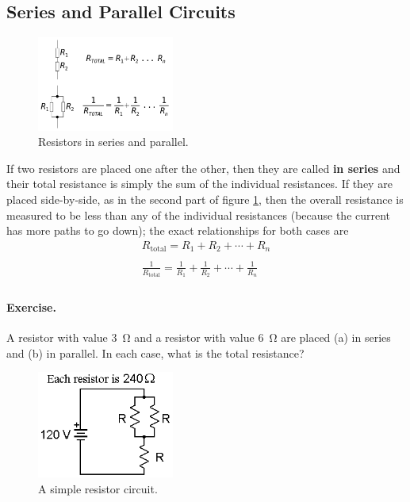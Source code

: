 \documentclass[a4paper]{amsbook}
\newcommand\capcite[1]{}
\begin{document}
\subsection{Series and Parallel Circuits}
\begin{figure}
  \centering
  \includegraphics[width=0.4\textwidth]{seriesparallel}
  \caption{Resistors in series and parallel. \capcite{https://i.stack.imgur.com/I3HNw.gif}\label{fig:seriesparallel}}
\end{figure}
If two resistors are placed one after the other, then they are called \textbf{in series} and their total resistance is simply the sum of the
individual resistances. If they are placed side-by-side, as in the second part of figure \ref{fig:seriesparallel}, then the overall resistance
is measured to be less than any of the individual resistances (because the current has more paths to go down); the exact relationships for
both cases are
\begin{align}
  R_{\text{total}} = R_1 + R_2 + \cdots + R_n \\ \tag*{(series)}\\
  \frac{1}{R_{\text{total}}} = \frac{1}{R_1} + \frac{1}{R_2} + \cdots + \frac{1}{R_n} \\ \tag*{(parallel)}
\end{align}

\paragraph{Exercise.} A resistor with value \SI{3}{\ohm} and a resistor with value \SI{6}{\ohm} are placed (a) in series and (b) in parallel.
In each case, what is the total resistance?

\begin{figure}
  \centering
  \includegraphics[width=0.4\textwidth]{circuit1}
  \caption{A simple resistor circuit. \capcite{http://www.physics.udel.edu/~watson/scen103/circuit4.gif}\label{fig:circuit1}}
\end{figure}
\end{document}
